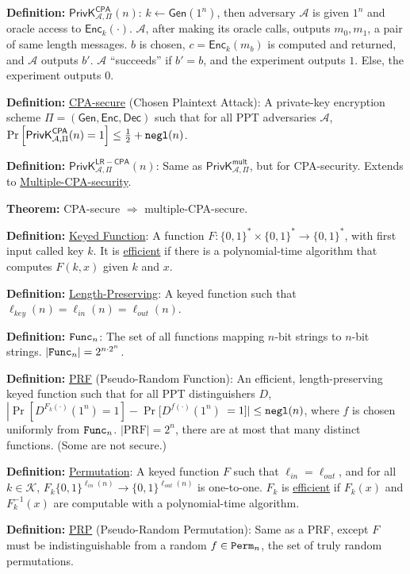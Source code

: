 \documentclass[10pt]{article}
\newcommand{\AAA}{\mathcal{A}}
\newcommand{\KKK}{\mathcal{K}}
\newcommand{\defn}[1]{{\bf Definition:} \underline{#1}}
\newcommand{\thm}[1]{{\bf Theorem:} \underline{#1}}
\newcommand{\Enc}{\mathsf{Enc}}
\newcommand{\Dec}{\mathsf{Dec}}
\newcommand{\Gen}{\mathsf{Gen}}
\newcommand{\GenEncDec}{(\Gen,\Enc,\Dec)}
\newcommand{\ExptMultArgs}[2]{\mathsf{PrivK}^{\mathsf{mult}}_{#1,#2}}
\newcommand{\ExptCpaArgs}[2]{\mathsf{PrivK}^{\mathsf{CPA}}_{#1,#2}}
\newcommand{\ExptLrCpa}{\mathsf{PrivK}^{\mathsf{LR-CPA}}_{\AAA,\Pi}}
\newcommand{\ExptMult}{\ExptMultArgs{\AAA}{\Pi}}
\newcommand{\ExptCpa}{\ExptCpaArgs{\AAA}{\Pi}}
\newcommand{\negl}{{\tt negl}}
\newcommand{\from}{\leftarrow}
\begin{document}
\begin{multicols}{3}

\defn{$\ExptCpa(n)$}: $k\from\Gen(1^n)$, then adversary $\AAA$ is given $1^n$ and oracle access to $\Enc_k(\cdot)$. $\AAA$, after making its oracle calls, outputs $m_0,m_1$, a pair of same length messages. $b$ is chosen, $c=\Enc_k(m_b)$ is computed and returned, and $\AAA$ outputs $b'$. $\AAA$ ``succeeds'' if $b'=b$, and the experiment outputs $1$. Else, the experiment outputs $0$.

\defn{CPA-secure} (Chosen Plaintext Attack): A private-key encryption scheme $\Pi=\GenEncDec$ such that for all PPT adversaries $\AAA$, $\Pr\left[\ExptCpa(n)=1\right]\leq\frac{1}{2}+\negl(n)$.

\defn{$\ExptLrCpa(n)$}: Same as $\ExptMult$, but for CPA-security. Extends to \underline{Multiple-CPA-security}.

\thm{}CPA-secure $\Rightarrow$ multiple-CPA-secure.

\defn{Keyed Function}: A function $F:\{0,1\}^*\times\{0,1\}^*\to\{0,1\}^*$, with first input called key $k$. It is \underline{efficient} if there is a polynomial-time algorithm that computes $F(k,x)$ given $k$ and $x$.

\defn{Length-Preserving}: A keyed function such that $\ell_{key}(n)=\ell_{in}(n)=\ell_{out}(n)$.

\defn{${\tt Func}_n$}: The set of all functions mapping $n$-bit strings to $n$-bit strings. $|{\tt Func}_n|=2^{n\cdot2^n}$.

\defn{PRF} (Pseudo-Random Function): An efficient, length-preserving keyed function such that for all PPT distinguishers $D$, $\left|\Pr[D^{F_k(\cdot)}(1^n)=1]-\Pr[D^{f(\cdot)}(1^n)\right.$ $\left.=1]\right|\leq\negl(n)$, where $f$ is chosen uniformly from ${\tt Func}_n$. $|\text{PRF}|=2^n$, there are at most that many distinct functions. (Some are not secure.)

\defn{Permutation}: A keyed function $F$ such that $\ell_{in}=\ell_{out}$, and for all $k\in\KKK$, $F_k\{0,1\}^{\ell_{in}(n)}\to\{0,1\}^{\ell_{out}(n)}$ is one-to-one. $F_k$ is \underline{efficient} if $F_k(x)$ and $F_k^{-1}(x)$ are computable with a polynomial-time algorithm.

\defn{PRP} (Pseudo-Random Permutation): Same as a PRF, except $F$ must be indistinguishable from a random $f\in{\tt Perm}_n$, the set of truly random permutations.


\end{multicols}
\end{document}
